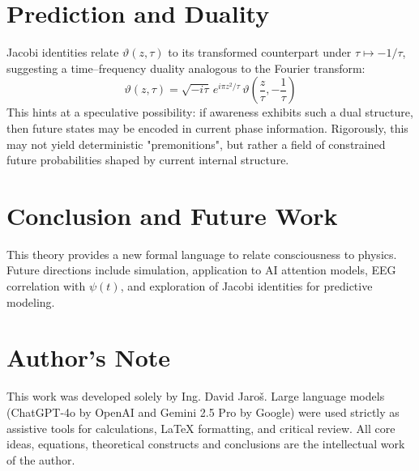 \documentclass[12pt]{article}
\begin{document}
\section{Prediction and Duality}

Jacobi identities relate $\vartheta(z, \tau)$ to its transformed counterpart under $\tau \mapsto -1/\tau$, suggesting a time--frequency duality analogous to the Fourier transform:
\[
\vartheta(z, \tau) = \sqrt{-i\tau} \, e^{i\pi z^2/\tau} \, \vartheta\left(\frac{z}{\tau}, -\frac{1}{\tau}\right)
\]
This hints at a speculative possibility: if awareness exhibits such a dual structure, then future states may be encoded in current phase information. Rigorously, this may not yield deterministic "premonitions", but rather a field of constrained future probabilities shaped by current internal structure.

\section{Conclusion and Future Work}

This theory provides a new formal language to relate consciousness to physics. Future directions include simulation, application to AI attention models, EEG correlation with $\psi(t)$, and exploration of Jacobi identities for predictive modeling.





\section*{Author's Note}

This work was developed solely by Ing. David Jaroš.  
Large language models (ChatGPT-4o by OpenAI and Gemini 2.5 Pro by Google) were used strictly as assistive tools for calculations, LaTeX formatting, and critical review.  
All core ideas, equations, theoretical constructs and conclusions are the intellectual work of the author.
\end{document}
